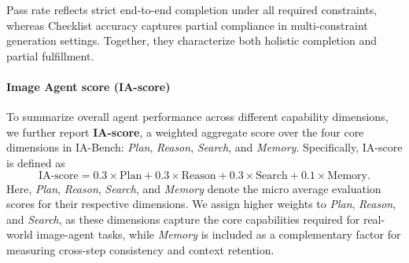 Pass rate reflects strict end-to-end completion under all required constraints, whereas Checklist accuracy captures partial compliance in multi-constraint generation settings. Together, they characterize both holistic completion and partial fulfillment.

\paragraph{Image Agent score (IA-score)}
To summarize overall agent performance across different capability dimensions, we further report \textbf{IA-score}, a weighted aggregate score over the four core dimensions in IA-Bench: \textit{Plan}, \textit{Reason}, \textit{Search}, and \textit{Memory}. Specifically, IA-score is defined as
\[
\mathrm{IA\text{-}score} = 0.3 \times \mathrm{Plan} + 0.3 \times \mathrm{Reason} + 0.3 \times \mathrm{Search} + 0.1 \times \mathrm{Memory}.
\]
Here, \textit{Plan}, \textit{Reason}, \textit{Search}, and \textit{Memory} denote the micro average evaluation scores for their respective dimensions. We assign higher weights to \textit{Plan}, \textit{Reason}, and \textit{Search}, as these dimensions capture the core capabilities required for real-world image-agent tasks, while \textit{Memory} is included as a complementary factor for measuring cross-step consistency and context retention.
